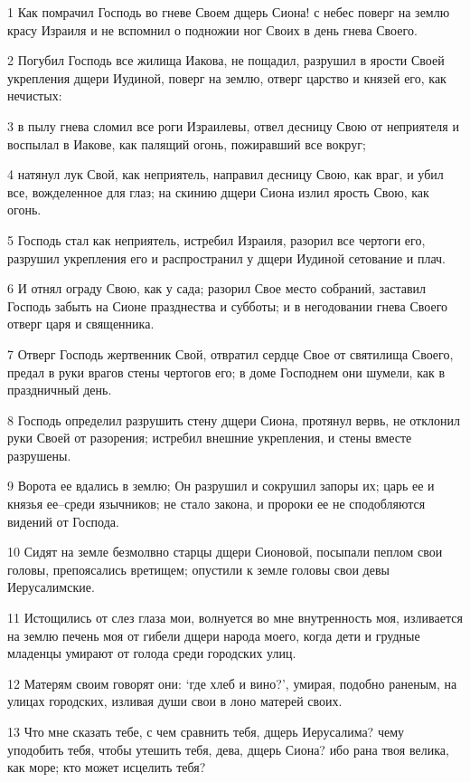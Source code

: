 \par 1 Как помрачил Господь во гневе Своем дщерь Сиона! с небес поверг на землю красу Израиля и не вспомнил о подножии ног Своих в день гнева Своего.
\par 2 Погубил Господь все жилища Иакова, не пощадил, разрушил в ярости Своей укрепления дщери Иудиной, поверг на землю, отверг царство и князей его, как нечистых:
\par 3 в пылу гнева сломил все роги Израилевы, отвел десницу Свою от неприятеля и воспылал в Иакове, как палящий огонь, пожиравший все вокруг;
\par 4 натянул лук Свой, как неприятель, направил десницу Свою, как враг, и убил все, вожделенное для глаз; на скинию дщери Сиона излил ярость Свою, как огонь.
\par 5 Господь стал как неприятель, истребил Израиля, разорил все чертоги его, разрушил укрепления его и распространил у дщери Иудиной сетование и плач.
\par 6 И отнял ограду Свою, как у сада; разорил Свое место собраний, заставил Господь забыть на Сионе празднества и субботы; и в негодовании гнева Своего отверг царя и священника.
\par 7 Отверг Господь жертвенник Свой, отвратил сердце Свое от святилища Своего, предал в руки врагов стены чертогов его; в доме Господнем они шумели, как в праздничный день.
\par 8 Господь определил разрушить стену дщери Сиона, протянул вервь, не отклонил руки Своей от разорения; истребил внешние укрепления, и стены вместе разрушены.
\par 9 Ворота ее вдались в землю; Он разрушил и сокрушил запоры их; царь ее и князья ее--среди язычников; не стало закона, и пророки ее не сподобляются видений от Господа.
\par 10 Сидят на земле безмолвно старцы дщери Сионовой, посыпали пеплом свои головы, препоясались вретищем; опустили к земле головы свои девы Иерусалимские.
\par 11 Истощились от слез глаза мои, волнуется во мне внутренность моя, изливается на землю печень моя от гибели дщери народа моего, когда дети и грудные младенцы умирают от голода среди городских улиц.
\par 12 Матерям своим говорят они: `где хлеб и вино?', умирая, подобно раненым, на улицах городских, изливая души свои в лоно матерей своих.
\par 13 Что мне сказать тебе, с чем сравнить тебя, дщерь Иерусалима? чему уподобить тебя, чтобы утешить тебя, дева, дщерь Сиона? ибо рана твоя велика, как море; кто может исцелить тебя?
